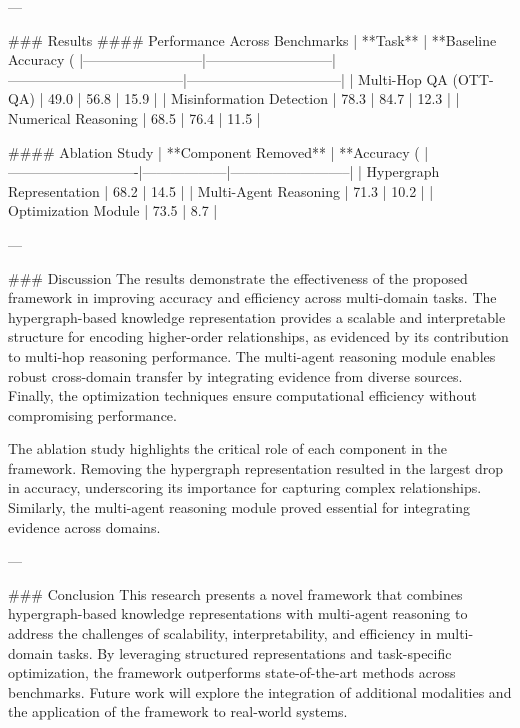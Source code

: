 ---

### Results
#### Performance Across Benchmarks
| **Task**                | **Baseline Accuracy (%
|--------------------------|---------------------------|--------------------------------------|---------------------------------|
| Multi-Hop QA (OTT-QA)    | 49.0                     | 56.8                                | 15.9                            |
| Misinformation Detection | 78.3                     | 84.7                                | 12.3                            |
| Numerical Reasoning      | 68.5                     | 76.4                                | 11.5                            |

#### Ablation Study
| **Component Removed**     | **Accuracy (%
|----------------------------|------------------|--------------------------|
| Hypergraph Representation | 68.2             | 14.5                     |
| Multi-Agent Reasoning      | 71.3             | 10.2                     |
| Optimization Module        | 73.5             | 8.7                      |

---

### Discussion
The results demonstrate the effectiveness of the proposed framework in improving accuracy and efficiency across multi-domain tasks. The hypergraph-based knowledge representation provides a scalable and interpretable structure for encoding higher-order relationships, as evidenced by its contribution to multi-hop reasoning performance. The multi-agent reasoning module enables robust cross-domain transfer by integrating evidence from diverse sources. Finally, the optimization techniques ensure computational efficiency without compromising performance.

The ablation study highlights the critical role of each component in the framework. Removing the hypergraph representation resulted in the largest drop in accuracy, underscoring its importance for capturing complex relationships. Similarly, the multi-agent reasoning module proved essential for integrating evidence across domains.

---

### Conclusion
This research presents a novel framework that combines hypergraph-based knowledge representations with multi-agent reasoning to address the challenges of scalability, interpretability, and efficiency in multi-domain tasks. By leveraging structured representations and task-specific optimization, the framework outperforms state-of-the-art methods across benchmarks. Future work will explore the integration of additional modalities and the application of the framework to real-world systems.

